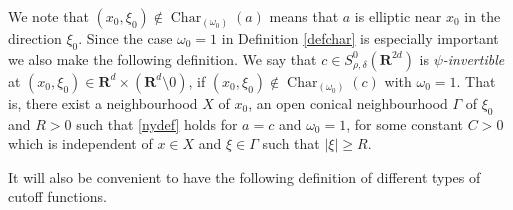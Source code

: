 \documentclass[12pt,a4paper,reqno]{amsart}
\numberwithin{equation}{section}
\numberwithin{thm}{section}
\theoremstyle{definition}
\theoremstyle{remark}
\begin{document}
\par

We note that $(x_0,\xi _0)\notin {\operatorname{Char}}_{(\omega _0)}(a)$ means that $a$
is elliptic near $x_0$ in the direction $\xi _0$. Since the case $\omega _0=1$ in Definition \ref{defchar} is especially important we also make the following definition. We say that $c\in
S^{0}_{\rho,\delta}({\mathbf R^{{2d}}})$ is
\emph{$\psi$-invertible} at $(x_0,\xi_0) \in {\mathbf R^{d}}\times ({\mathbf R^{d}}{\setminus 0})$, if $(x_0,\xi _0)\notin {\operatorname{Char}} _{(\omega _0)}(c)$ with $\omega _0=1$. That is,  there exist a neighbourhood $X$ of $x_0$, an open conical
neighbourhood $\Gamma$ of $\xi_0$ and $R >0$ such that \eqref{nydef} holds for $a=c$ and $\omega _0=1$,
for some constant $C>0$ which is independent of $x\in X$
and $\xi\in \Gamma$ such that $|\xi|\geq R$.

\par

It will also be convenient to have the following definition of different types of cutoff functions.

\par
\end{document}
